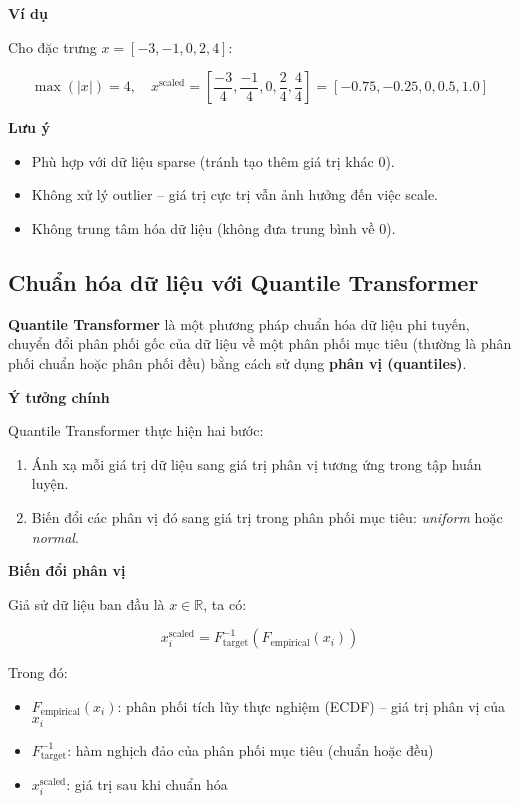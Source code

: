 \textbf{Ví dụ}

Cho đặc trưng \( x = [-3, -1, 0, 2, 4] \):

\[
\max(|x|) = 4, \quad x^{\text{scaled}} = \left[ \frac{-3}{4}, \frac{-1}{4}, 0, \frac{2}{4}, \frac{4}{4} \right] = [-0.75, -0.25, 0, 0.5, 1.0]
\]

\textbf{Lưu ý}

\begin{itemize}
    \item Phù hợp với dữ liệu sparse (tránh tạo thêm giá trị khác 0).
    \item Không xử lý outlier – giá trị cực trị vẫn ảnh hưởng đến việc scale.
    \item Không trung tâm hóa dữ liệu (không đưa trung bình về 0).
\end{itemize}

\subsection{Chuẩn hóa dữ liệu với Quantile Transformer}
\label{scaler:quantile}

\textbf{Quantile Transformer} là một phương pháp chuẩn hóa dữ liệu phi tuyến, chuyển đổi phân phối gốc của dữ liệu về một phân phối mục tiêu (thường là phân phối chuẩn hoặc phân phối đều) bằng cách sử dụng \textbf{phân vị (quantiles)}.

\textbf{Ý tưởng chính}

Quantile Transformer thực hiện hai bước:

\begin{enumerate}
    \item Ánh xạ mỗi giá trị dữ liệu sang giá trị phân vị tương ứng trong tập huấn luyện.
    \item Biến đổi các phân vị đó sang giá trị trong phân phối mục tiêu: \textit{uniform} hoặc \textit{normal}.
\end{enumerate}

\textbf{Biến đổi phân vị}

Giả sử dữ liệu ban đầu là \( x \in \mathbb{R} \), ta có:

\[
x_i^{\text{scaled}} = F_{\text{target}}^{-1}(F_{\text{empirical}}(x_i))
\]

Trong đó:
\begin{itemize}
    \item \( F_{\text{empirical}}(x_i) \): phân phối tích lũy thực nghiệm (ECDF) – giá trị phân vị của \( x_i \)
    \item \( F_{\text{target}}^{-1} \): hàm nghịch đảo của phân phối mục tiêu (chuẩn hoặc đều)
    \item \( x_i^{\text{scaled}} \): giá trị sau khi chuẩn hóa
\end{itemize}

